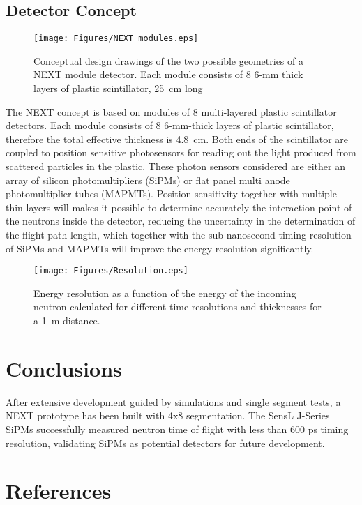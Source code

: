 \documentclass[preprint,3p,twocolumn]{elsarticle}
\begin{document}
\subsection{Detector Concept}

\begin{figure}[tp]
\centering
\texttt{[image: Figures/NEXT\_modules.eps]}
\caption{Conceptual design  drawings of the two possible geometries of a NEXT module detector. Each  module consists of 8 6-mm thick layers of plastic scintillator, 25~cm long}
\label{fig:NEXT_modules}
\end{figure}


The NEXT concept is based on modules of 8 multi-layered plastic scintillator detectors. Each  module consists of 8 6-mm-thick layers of plastic scintillator, therefore the total effective thickness is 4.8~cm. Both ends of the scintillator are coupled to position sensitive photosensors for reading out the light produced from scattered particles in the plastic. These photon sensors considered  are either an array of silicon photomultipliers (SiPMs) or flat panel multi anode photomultiplier tubes (MAPMTs). Position sensitivity together with multiple thin layers will makes it possible to determine  accurately the interaction point of the neutrons inside the detector, reducing the uncertainty in the determination of the flight path-length, which together with the sub-nanosecond timing resolution of SiPMs and MAPMTs will improve the energy resolution significantly.

\begin{figure}[tb]
\centering
\texttt{[image: Figures/Resolution.eps]}
\caption{Energy resolution as a function of the energy of the incoming neutron calculated for different time resolutions and thicknesses for a 1~m distance.}
\label{fig:resolution}
\end{figure}







\section{Conclusions}
After extensive development guided by simulations and single segment tests, a NEXT prototype has been built with 4x8 segmentation. The SensL\textsuperscript{\texttrademark} J-Series SiPMs successfully measured neutron time of flight with less than 600 ps timing resolution, validating SiPMs as potential detectors for future development.

\section*{References}
%

\end{document}
